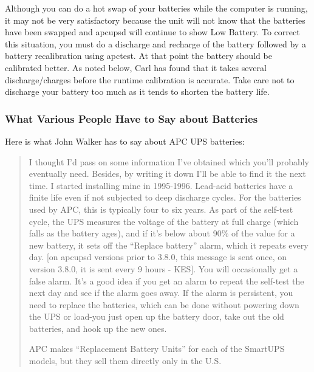 {{{{{{{{{Although you can do a hot swap of your batteries while the computer is
running, it may not be very satisfactory because the unit will not know that
the batteries have been swapped and apcupsd will continue to show Low Battery.
To correct this situation, you must do a discharge and recharge of the
battery followed by a battery recalibration using apctest.  At that point the
battery should be calibrated better.  As noted below, Carl has found that it
takes several discharge/charges before the runtime calibration is accurate. 
Take care not to discharge your battery too much as it tends to shorten the
battery life. 

\label{What-Various-People-Have-to-Say-about-Batteries}

\subsubsection*{What Various People Have to Say about Batteries}

\label{index-Batteries-145}
Here is what John Walker has to say about APC UPS batteries:  

\begin{quote}

I thought I'd pass on some information I've obtained which you'll probably
eventually need. Besides, by writing it down I'll be able to find it the next
time. I started installing mine in 1995-1996. Lead-acid batteries have a
finite life even if not subjected to deep discharge cycles. For the batteries
used by APC, this is typically four to six years. As part of the self-test
cycle, the UPS measures the voltage of the battery at full charge (which falls
as the battery ages), and if it's below about 90\% of the value for a new
battery, it sets off the ``Replace battery'' alarm, which it repeats every
day. [on apcupsd versions prior to 3.8.0, this message is sent once, on
version 3.8.0, it is sent every 9 hours - KES]. You will occasionally get a
false alarm. It's a good idea if you get an alarm to repeat the self-test the
next day and see if the alarm goes away. If the alarm is persistent, you need
to replace the batteries, which can be done without powering down the UPS or
load-you just open up the battery door, take out the old batteries, and hook
up the new ones.  

APC makes ``Replacement Battery Units'' for each of the SmartUPS models, but
they sell them directly only in the U.S.  


\end{quote}}}}}}}}}}
